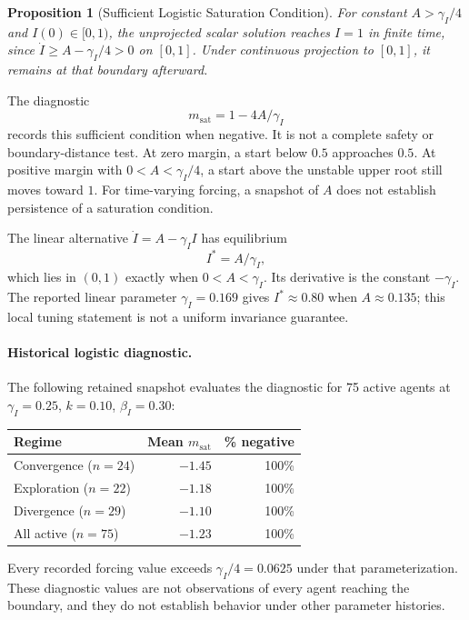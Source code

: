 \documentclass[11pt,twocolumn]{article}
\newtheorem{proposition}[theorem]{Proposition}
\begin{document}
\begin{proposition}[Sufficient Logistic Saturation Condition]
\label{prop:saturation}
For constant $A>\gamma_I/4$ and $I(0)\in[0,1)$, the unprojected
scalar solution reaches $I=1$ in finite time, since
$\dot I\ge A-\gamma_I/4>0$ on $[0,1]$. Under continuous
projection to $[0,1]$, it remains at that boundary afterward.
\end{proposition}
The diagnostic
\begin{equation}
 m_{\mathrm{sat}}=1-4A/\gamma_I
 \label{eq:saturation-margin}
\end{equation}
records this sufficient condition when negative. It is not a
complete safety or boundary-distance test. At zero margin, a
start below $0.5$ approaches $0.5$. At positive margin with
$0<A<\gamma_I/4$, a start above the unstable upper root still
moves toward $1$. For time-varying forcing, a snapshot of $A$
does not establish persistence of a saturation condition.

The linear alternative $\dot I=A-\gamma_I I$ has equilibrium
\begin{equation}
 I^*=A/\gamma_I,
 \label{eq:I-star-linear}
\end{equation}
which lies in $(0,1)$ exactly when $0<A<\gamma_I$. Its derivative
is the constant $-\gamma_I$. The reported linear parameter
$\gamma_I=0.169$ gives $I^*\approx0.80$ when $A\approx0.135$;
this local tuning statement is not a uniform invariance guarantee.

\paragraph{Historical logistic diagnostic.}
The following retained snapshot evaluates the diagnostic for
75 active agents at $\gamma_I=0.25$, $k=0.10$, $\beta_I=0.30$:
\begin{center}
\small
\begin{tabular}{@{}lrr@{}}
\toprule
Regime & Mean $m_{\mathrm{sat}}$ & \% negative\\
\midrule
Convergence ($n=24$) & $-1.45$ & 100\%\\
Exploration ($n=22$) & $-1.18$ & 100\%\\
Divergence ($n=29$) & $-1.10$ & 100\%\\
\midrule
All active ($n=75$) & $-1.23$ & 100\%\\
\bottomrule
\end{tabular}
\end{center}
Every recorded forcing value exceeds $\gamma_I/4=0.0625$
under that parameterization. These diagnostic values are not
observations of every agent reaching the boundary, and they do
not establish behavior under other parameter histories.
\end{document}
